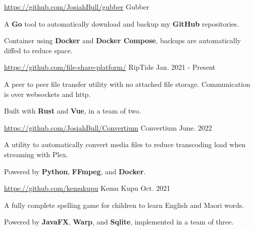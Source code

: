 
\begin{cventries}
  \cventry
    {\href{https://github.com/JosiahBull/gubber}{\faLink \space https://github.com/JosiahBull/gubber}}
    {Gubber}
    {}
    {} %
    {
      \begin{cvitems}
        \item {A \textbf{Go} tool to automatically download and backup my \textbf{GitHub} repositories.}
        \item {Container using \textbf{Docker} and \textbf{Docker Compose}, backups are automatically diffed to reduce space.}
      \end{cvitems}
    }

  \cventry
    {\href{https://github.com/file-share-platform}{\faLink \space https://github.com/file-share-platform/}} %
    {RipTide} %
    {} %
    {Jan. 2021 - Present} %
    {
      \begin{cvitems} %
        \item {A peer to peer file transfer utility with no attached file storage. Communication is over websockets and http.}
        \item {Built with \textbf{Rust} and \textbf{Vue}, in a team of two.}
      \end{cvitems}
    }

  \cventry
  {\href{https://github.com/JosiahBull/Convertium}{\faLink \space https://github.com/JosiahBull/Convertium}} %
  {Convertium} %
  {} %
  {June. 2022} %
  {
    \begin{cvitems} %
      \item {A utility to automatically convert media files to reduce transcoding load when streaming with Plex.}
      \item {Powered by \textbf{Python}, \textbf{FFmpeg}, and \textbf{Docker}.}
    \end{cvitems}
  }

  \cventry
    {\href{https://github.com/kemukupu}{\faLink \space https://github.com/kemukupu}} %
    {Kemu Kupu} %
    {} %
    {Oct. 2021} %
    {
      \begin{cvitems} %
        \item {A fully complete spelling game for children to learn English and Maori words.}
        \item {Powered by \textbf{JavaFX}, \textbf{Warp}, and \textbf{Sqlite}, implemented in a team of three.}
      \end{cvitems}
    }

\end{cventries}

